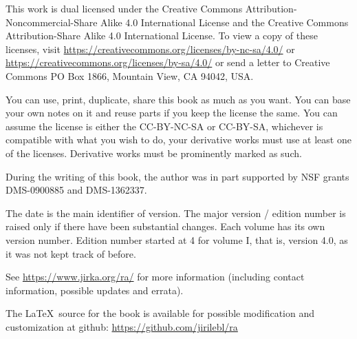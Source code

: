 \documentclass[12pt]{book}
\theoremstyle{plain}
\theoremstyle{remark}
\theoremstyle{definition}
\theoremstyle{exercise}
\theoremstyle{example}
\begin{document}
\bigskip

\noindent
This work
is dual licensed under
the Creative Commons
Attribution-Non\-commercial-Share Alike 4.0 International License and
the Creative Commons
Attribution-Share Alike 4.0 International License.
To view a
copy of these licenses, visit
\url{https://creativecommons.org/licenses/by-nc-sa/4.0/}
or
\url{https://creativecommons.org/licenses/by-sa/4.0/}
or send a letter to
Creative Commons
PO Box 1866, Mountain View, CA 94042, USA\@.

\bigskip

\noindent
You can use, print, duplicate, share this book as much as you want.  You can
base your own notes on it and reuse parts if you keep the license the
same.  You can assume the license is either the CC-BY-NC-SA or CC-BY-SA\@,
whichever is compatible with what you wish to do, your derivative works must
use at least one of the licenses.
Derivative works must be prominently marked as such.

\bigskip

\noindent
During the writing of this book, 
the author was in part supported by NSF grants DMS-0900885 and
DMS-1362337.

\bigskip

\noindent
The date is the main identifier of version.  The major version / edition
number is raised only if there have been substantial changes.  Each
volume has its own version number.  Edition
number started at 4 for volume I, that is, version 4.0, as it was not kept track of
before.  %

\bigskip

\noindent
See \url{https://www.jirka.org/ra/} for more information
(including contact information, possible updates and errata).

\bigskip

\noindent
The \LaTeX\ source for the book is available
for possible modification and customization
at github: \url{https://github.com/jirilebl/ra}



\tableofcontents
{}

\newpage


\end{document}
